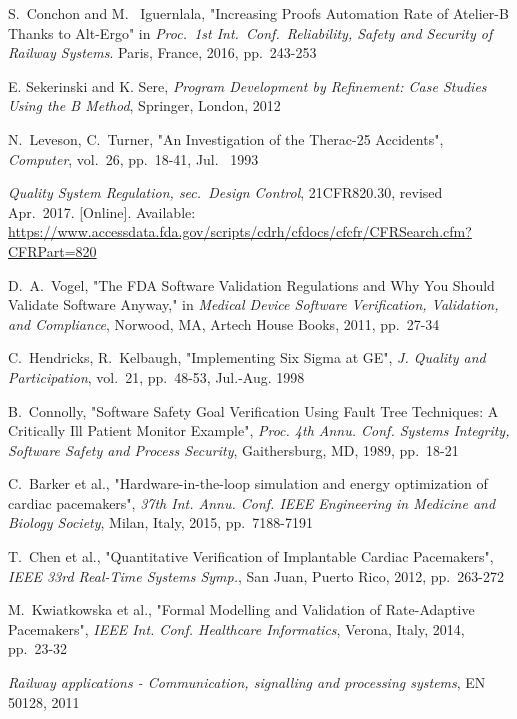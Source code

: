 \documentclass[11pt,journal]{IEEEtran}
\begin{document}
	
	\begin{thebibliography}{2}
		S.~Conchon and M.~ Iguernlala, "Increasing Proofs Automation Rate of Atelier-B Thanks to Alt-Ergo" in \emph{Proc.~1st Int.~Conf.~Reliability, Safety and Security of Railway Systems}. Paris, France, 2016, pp.~243-253
		
		E. Sekerinski and K. Sere, \emph{Program Development by Refinement: Case Studies Using the B Method}, Springer, London, 2012
		
		N.~Leveson, C.~Turner, "An Investigation of the Therac-25 Accidents", \emph{Computer}, vol.~26, pp.~18-41, Jul.~ 1993
		
		\emph{Quality System Regulation, sec.~Design Control}, 21CFR820.30, revised Apr.~2017. [Online]. Available:
		\url{https://www.accessdata.fda.gov/scripts/cdrh/cfdocs/cfcfr/CFRSearch.cfm?CFRPart=820}
		
		D.~A.~Vogel, "The FDA Software Validation Regulations and Why You Should Validate Software Anyway," in \emph{Medical Device Software Verification, Validation, and Compliance}, Norwood, MA, Artech House Books, 2011, pp.~27-34
		
		C.~Hendricks, R.~Kelbaugh, "Implementing Six Sigma at GE", \emph{J. Quality and Participation}, vol.~21, pp.~48-53, Jul.-Aug. 1998
		
		B.~Connolly, "Software Safety Goal Verification Using Fault Tree Techniques: A Critically Ill Patient Monitor Example", \emph{Proc. 4th Annu. Conf. Systems Integrity, Software Safety and Process Security}, Gaithersburg, MD, 1989, pp.~18-21
		
		C.~Barker et al., "Hardware-in-the-loop simulation and energy optimization of cardiac	pacemakers", \emph{37th Int. Annu. Conf. IEEE Engineering in Medicine and Biology Society}, Milan, Italy, 2015, pp.~7188-7191
		
		T.~Chen et al., "Quantitative Verification of Implantable Cardiac Pacemakers", \emph{IEEE 33rd Real-Time Systems Symp.}, San Juan, Puerto Rico, 2012, pp.~263-272
		
		M.~Kwiatkowska et al., "Formal Modelling and Validation of Rate-Adaptive Pacemakers", \emph{IEEE Int. Conf. Healthcare Informatics}, Verona, Italy, 2014, pp.~23-32
		
		\emph{Railway applications - Communication, signalling and processing systems}, EN 50128, 2011
		

\end{thebibliography}
\end{document}
